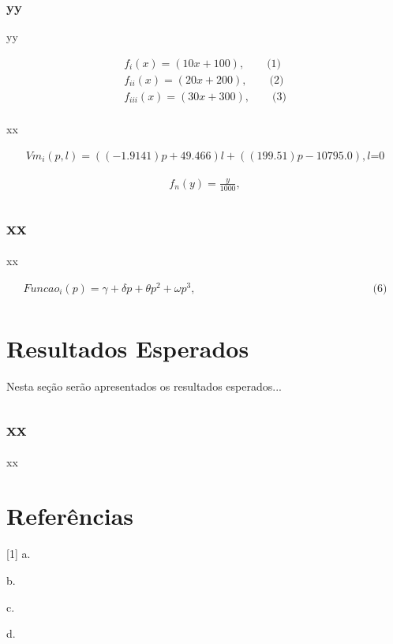 \documentclass[12pt]{article}
\begin{document}
\newpage
\subsubsection{yy}

yy

\begin{align*}
f_{i}(x) = (10x + 100), \qquad \text{(1)} \tag{1}\\
f_{ii}(x) = (20x + 200), \qquad \text{(2)} \tag{2} \\
f_{iii}(x) = (30x + 300), \qquad \text{(3)} \tag{3} \\
\end{align*} %

xx

\begin{align*}
Vm_{i}(p,l) = ((-1.9141)p + 49.466)l + ((199.51)p - 10795.0), \text {$l$=0} \tag{4}
\end{align*}

\begin{align*}
f_{n}(y) = \frac{y}{1000}, \tag{5}
\end{align*}

\subsection{xx}

xx

\begin{align*} 
Funcao_{i}(p) = \gamma + \delta p + \theta p^2 + \omega p^3, \qquad \qquad \qquad \qquad \qquad \qquad \qquad \qquad \text{(6)} \tag{6} \\
\end{align*} %

\newpage
\section{Resultados Esperados}

Nesta seção serão apresentados os resultados esperados...

\subsection{xx}

xx

\newpage
\section{Referências}

[1] a.

\noindent [2] b.

\noindent [3] c.

\noindent [4] d.
\end{document}
